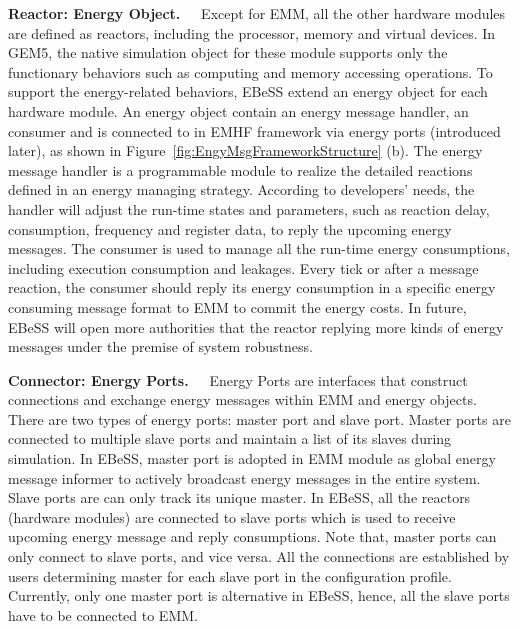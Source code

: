 \textbf{Reactor: Energy Object.\ \ }
Except for EMM, all the other hardware modules are defined as reactors, including the processor, memory and virtual devices.
In GEM5, the native simulation object for these module supports only the functionary behaviors such as computing and memory accessing operations.
To support the energy-related behaviors, EBeSS extend an energy object for each hardware module.
An energy object contain an energy message handler, an consumer and is connected to in EMHF framework via energy ports (introduced later), as shown in Figure~\ref{fig:EngyMsgFrameworkStructure} (b). 
The energy message handler is a programmable module to realize the detailed reactions defined in an energy managing strategy.
According to developers' needs, the handler will adjust the run-time states and parameters, such as reaction delay, consumption, frequency and register data, to reply the upcoming energy messages.
The consumer is used to manage all the run-time energy consumptions, including execution consumption and leakages.
Every tick or after a message reaction, the consumer should reply its energy consumption in a specific energy consuming message format to EMM to commit the energy costs.
In future, EBeSS will open more authorities that the reactor replying more kinds of energy messages under the premise of system robustness.

\textbf{Connector: Energy Ports.\ \ }
Energy Ports are interfaces that construct connections and exchange energy messages within EMM and energy objects. 
There are two types of energy ports: master port and slave port.
Master ports are connected to multiple slave ports and maintain a list of its slaves during simulation.
In EBeSS, master port is adopted in EMM module as global energy message informer to actively broadcast energy messages in the entire system.
Slave ports are can only track its unique master.
In EBeSS, all the reactors (hardware modules) are connected to slave ports which is used to receive upcoming energy message and reply consumptions.
Note that, master ports can only connect to slave ports, and vice versa.
All the connections are established by users determining master for each slave port in the configuration profile. 
Currently, only one master port is alternative in EBeSS, hence, all the slave ports have to be connected to EMM.

\begin{comment}

 
\end{comment}